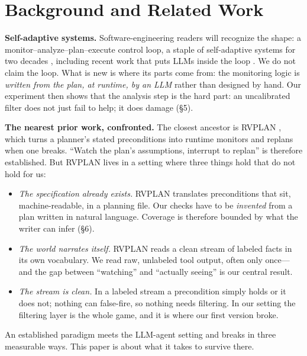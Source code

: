 \documentclass[acmsmall,screen]{acmart}
\begin{document}
\section{Background and Related Work}
\textbf{Self-adaptive systems.} Software-engineering readers will recognize the
shape: a monitor--analyze--plan--execute control loop, a staple of
self-adaptive systems for two decades \cite{ref23, ref24}, including recent work
that puts LLMs inside the loop \cite{ref25, ref26}. We do not claim the loop.
What is new is where its parts come from: the monitoring logic is \emph{written
from the plan, at runtime, by an LLM} rather than designed by hand. Our
experiment then shows that the analysis step is the hard part: an uncalibrated
filter does not just fail to help; it does damage (\S5).

\textbf{The nearest prior work, confronted.} The closest ancestor is RVPLAN
\cite{ref6, ref34}, which turns a planner's stated preconditions into runtime
monitors and replans when one breaks. ``Watch the plan's assumptions, interrupt
to replan'' is therefore established. But RVPLAN lives in a setting where three
things hold that do not hold for us:

\begin{itemize}
  \item \emph{The specification already exists.} RVPLAN translates
  preconditions that sit, machine-readable, in a planning file. Our checks have
  to be \emph{invented} from a plan written in natural language. Coverage is
  therefore bounded by what the writer can infer (\S6).
  \item \emph{The world narrates itself.} RVPLAN reads a clean stream of
  labeled facts in its own vocabulary. We read raw, unlabeled tool output,
  often only once---and the gap between ``watching'' and ``actually seeing'' is
  our central result.
  \item \emph{The stream is clean.} In a labeled stream a precondition simply
  holds or it does not; nothing can false-fire, so nothing needs filtering. In
  our setting the filtering layer is the whole game, and it is where our first
  version broke.
\end{itemize}

An established paradigm meets the LLM-agent setting and breaks in three
measurable ways. This paper is about what it takes to survive there.
\end{document}
